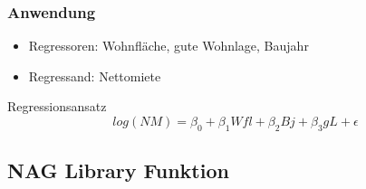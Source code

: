 \documentclass{beamer}
\begin{document}
\begin{frame}
  \frametitle{Anwendung}
  

  \begin{itemize}
  \item Regressoren: Wohnfläche, gute Wohnlage, Baujahr
  \item Regressand: Nettomiete
  \end{itemize}

  \begin{block}{Regressionsansatz}
    \begin{equation*}
      log(NM) = \beta_0 + \beta_1 Wfl + \beta_2 Bj + \beta_3 gL + \epsilon
    \end{equation*}
  \end{block}


\end{frame}

\subsection{NAG Library Funktion}
\end{document}

